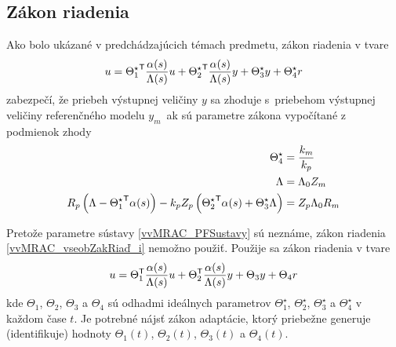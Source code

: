 \documentclass[a4paper, 10pt, ]{article}
\begin{document}
\subsection{Zákon riadenia}

Ako bolo ukázané v predchádzajúcich témach predmetu, zákon riadenia v tvare
\begin{equation} \label{vvMRAC_vseobZakRiaď_i}
	u = {\Theta_1^\star}^{\mathsf{T}} \frac{\alpha(s)}{\Lambda(s)} u + {\Theta_2^\star}^{\mathsf{T}} \frac{\alpha(s)}{\Lambda(s)} y + \Theta_3^\star y + \Theta_4^\star r
\end{equation}
zabezpečí, že priebeh výstupnej veličiny $y$ sa zhoduje s~priebehom výstupnej veličiny referenčného modelu $y_m$~ak sú parametre zákona vypočítané z podmienok zhody
\begin{subequations}
	\begin{align} \label{vvMRAC_idealTh4}
		\Theta_4^\star &= \frac{k_m}{k_p} \\
		\Lambda &= \Lambda_0 Z_m  \label{vvMRAC_idealLambda} \\
		R_p \left( \Lambda - {\Theta_1^\star}^{\mathsf{T}} \alpha(s) \right) -  k_p Z_p 	\left( {\Theta_2^\star}^{\mathsf{T}}  \alpha(s) +  \Theta_3^\star\Lambda	 \right) &= Z_p \Lambda_0 R_m
	\end{align}
\end{subequations}

Pretože parametre sústavy \eqref{vvMRAC_PFSustavy} sú neznáme, zákon riadenia \eqref{vvMRAC_vseobZakRiaď_i} nemožno použiť. Použije sa zákon riadenia v tvare
\begin{equation} \label{vvMRAC_vseobZakRiad}
	u = \Theta_1^{\mathsf{T}} \frac{\alpha(s)}{\Lambda(s)} u + \Theta_2^{\mathsf{T}} \frac{\alpha(s)}{\Lambda(s)} y + \Theta_3 y + \Theta_4 r
\end{equation}
kde $\Theta_1$, $\Theta_2$, $\Theta_3$ a $\Theta_4$ sú odhadmi ideálnych parametrov $\Theta_1^\star$, $\Theta_2^\star$, $\Theta_3^\star$ a $\Theta_4^\star$ v každom čase $t$. Je potrebné nájsť zákon adaptácie, ktorý priebežne generuje (identifikuje) hodnoty $\Theta_1(t)$, $\Theta_2(t)$, $\Theta_3(t)$ a $\Theta_4(t)$.
\end{document}
